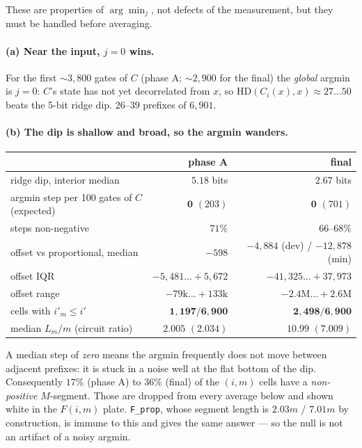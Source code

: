 \documentclass[11pt]{article}
\newcommand{\code}[1]{\texttt{#1}}
\newcommand{\HD}{\mathrm{HD}}
\begin{document}
These are properties of $\arg\min_j$, not defects of the measurement, but they must be handled before
averaging.

\paragraph{(a) Near the input, $j=0$ wins.} For the first ${\sim}3{,}800$ gates of $C$ (phase A;
${\sim}2{,}900$ for the final) the \emph{global} argmin is $j=0$: $C$'s state has not yet decorrelated
from $x$, so $\HD(C_i(x),x)\approx27\ldots50$ beats the 5-bit ridge dip. $26$--$39$ prefixes of $6{,}901$.

\paragraph{(b) The dip is shallow and broad, so the argmin wanders.}
\begin{center}\small
\begin{tabular}{@{}lrr@{}}
\toprule
 & phase A & final \\
\midrule
ridge dip, interior median & $5.18$ bits & $2.67$ bits \\
argmin step per 100 gates of $C$ (expected) & $\mathbf{0}$ $(203)$ & $\mathbf{0}$ $(701)$ \\
steps non-negative & $71\%$ & $66$--$68\%$ \\
offset vs proportional, median & $-598$ & $-4{,}884$ (dev) / $-12{,}878$ (min) \\
offset IQR & $-5{,}481 \ldots +5{,}672$ & $-41{,}325 \ldots +37{,}973$ \\
offset range & $-79\mathrm{k} \ldots +133\mathrm{k}$ & $-2.4\mathrm{M} \ldots +2.6\mathrm{M}$ \\
cells with $i'_m \le i'$ & $\mathbf{1{,}197/6{,}900}$ & $\mathbf{2{,}498/6{,}900}$ \\
median $L_m/m$ (circuit ratio) & $2.005$ $(2.034)$ & $10.99$ $(7.009)$ \\
\bottomrule
\end{tabular}
\end{center}
A median step of \emph{zero} means the argmin frequently does not move between adjacent prefixes: it is
stuck in a noise well at the flat bottom of the dip. Consequently $17\%$ (phase A) to $36\%$ (final) of
the $(i,m)$ cells have a \emph{non-positive} $M$-segment. Those are dropped from every average below and
shown white in the $F(i,m)$ plate. \code{F\_prop}, whose segment length is $2.03m$ / $7.01m$ by
construction, is immune to this and gives the same answer --- so the null is not an artifact of a noisy
argmin.
\end{document}
